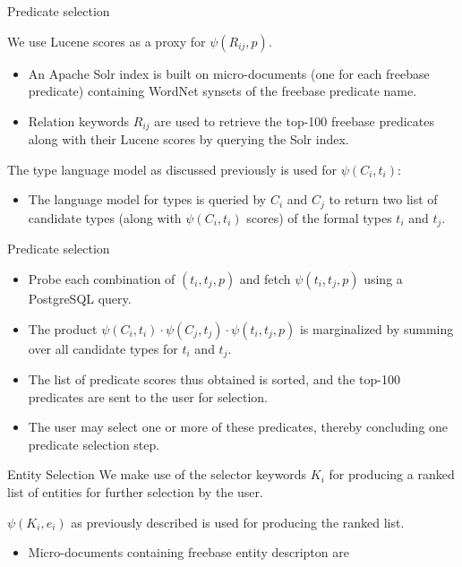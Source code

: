 \documentclass[pdf,11pt]{beamer}
\begin{document}
\begin{frame}{Predicate selection}

We use Lucene scores as a proxy for $\psi(R_{ij}, p)$.
\begin{itemize}
\item An Apache Solr index is built on micro-documents (one for each freebase predicate) containing WordNet synsets of the freebase predicate name.
\item Relation keywords $R_{ij}$ are used to retrieve the top-100 freebase predicates along with their Lucene scores by querying the Solr index.
\end{itemize}


The type language model as discussed previously is used for $\psi(C_i,t_i)$:
\begin{itemize}
\item The language model for types is queried by $C_i$ and $C_j$ to return two list of candidate types (along with $\psi(C_i,t_i)$ scores) of the formal types $t_i$ and $t_j$.

\end{itemize}

\end{frame}

\begin{frame}{Predicate selection}
\begin{itemize}
\item Probe each combination of $(t_i,t_j,p)$  and fetch $\psi(t_i,t_j,p)$ using a PostgreSQL query.
\item The product $\psi(C_i,t_i) \cdot \psi(C_j,t_j) \cdot \psi(t_i,t_j,p)$ is  marginalized by summing over all candidate types for $t_i$ and $t_j$.

\item The list of predicate scores thus obtained is sorted, and the top-100 predicates are sent to the user for selection.
\item The user may select one or more of these predicates, thereby concluding one predicate selection step.
\end{itemize}
\end{frame}

\begin{frame}{Entity Selection}
We make use of the selector keywords $K_i$ for producing a ranked list of entities for further selection by the user.

$ \psi(K_i,e_i)$ as previously described is used for producing the ranked list.

\begin{itemize}
\item Micro-documents containing freebase entity descripton are
\end{itemize}
\end{frame}
\end{document}
